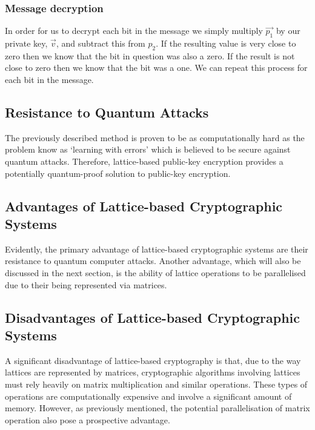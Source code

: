 \documentclass[journal]{IEEEtran}
\begin{document}
\subsubsection{Message decryption}

In order for us to decrypt each bit in the message we simply multiply $\vec{p_1}$ by our private key, $\vec{v}$, and subtract this from $p_2$. If the resulting value is very close to zero then we know that the bit in question was also a zero. If the result is not close to zero then we know that the bit was a one. We can repeat this process for each bit in the message.

\subsection{Resistance to Quantum Attacks}

The previously described method is proven to be as computationally hard as the problem know as `learning with errors' which is believed to be secure against quantum attacks\cite{lattice:regev}. Therefore, lattice-based public-key encryption provides a potentially quantum-proof solution to public-key encryption.

\subsection{Advantages of Lattice-based Cryptographic Systems}

Evidently, the primary advantage of lattice-based cryptographic systems are their resistance to quantum computer attacks. Another advantage, which will also be discussed in the next section, is the ability of lattice operations to be parallelised due to their being represented via matrices.

\subsection{Disadvantages of Lattice-based Cryptographic Systems}

A significant disadvantage of lattice-based cryptography is that, due to the way lattices are represented by matrices, cryptographic algorithms involving lattices must rely heavily on matrix multiplication and similar operations. These types of operations are computationally expensive and involve a significant amount of memory. However, as previously mentioned, the potential parallelisation of matrix operation also pose a prospective advantage.
\end{document}
